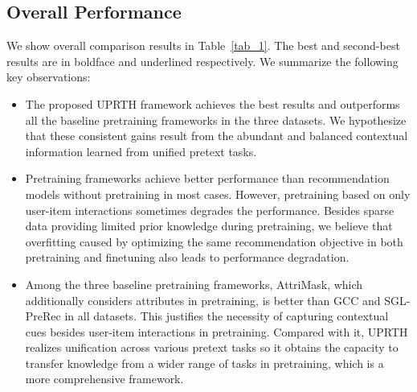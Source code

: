 \subsection{Overall Performance}
We show overall comparison results in Table~\ref{tab_1}. The best and second-best results are
in boldface and underlined respectively. We summarize the following key observations:
\begin{itemize}[leftmargin=*]
    \item The proposed UPRTH framework achieves the best results and outperforms all the baseline pretraining frameworks in the three datasets. 
    We hypothesize that these consistent gains result from the abundant and balanced contextual information learned from unified pretext tasks.
    \item Pretraining frameworks achieve better performance than recommendation models without pretraining in most cases. However, pretraining based on only user-item interactions sometimes degrades the performance. Besides sparse data providing limited prior knowledge during pretraining, we believe that overfitting caused by optimizing the same recommendation objective in both pretraining and finetuning also leads to performance degradation.
    \item Among the three baseline pretraining frameworks, AttriMask, which additionally considers attributes in pretraining, is better than GCC and SGL-PreRec in all datasets. This justifies the necessity of capturing contextual cues besides user-item interactions in pretraining. Compared with it, UPRTH realizes unification across various pretext tasks so it obtains the capacity to transfer knowledge from a wider range of tasks in pretraining, which is a more comprehensive framework.
\end{itemize}

